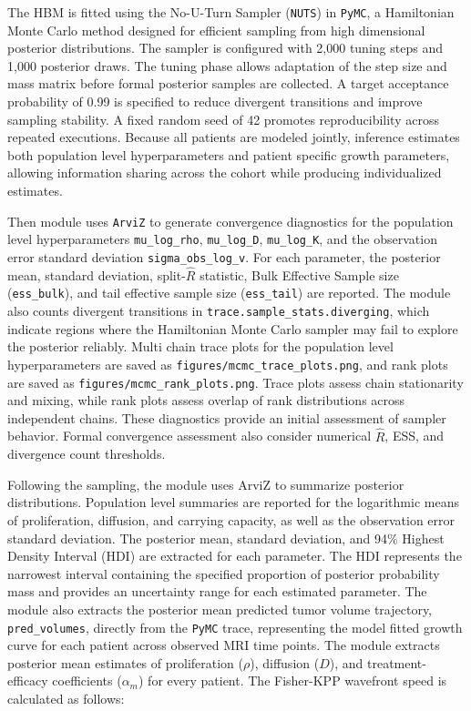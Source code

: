 The HBM is fitted using the No-U-Turn Sampler (\texttt{NUTS}) in \texttt{PyMC}, a Hamiltonian Monte Carlo method designed for efficient sampling from high dimensional posterior distributions. The sampler is configured with 2,000 tuning steps and 1,000 posterior draws. The tuning phase allows adaptation of the step size and mass matrix before formal posterior samples are collected. A target acceptance probability of 0.99 is specified to reduce divergent transitions and improve sampling stability. A fixed random seed of 42 promotes reproducibility across repeated executions. Because all patients are modeled jointly, inference estimates both population level hyperparameters and patient specific growth parameters, allowing information sharing across the cohort while producing individualized estimates.

Then module uses \texttt{ArviZ} to generate convergence diagnostics for the population level hyperparameters \texttt{mu\_log\_rho}, \texttt{mu\_log\_D}, \texttt{mu\_log\_K}, and the observation error standard deviation \texttt{sigma\_obs\_log\_v}. For each parameter, the posterior mean, standard deviation, split-$\widehat{R}$ statistic, Bulk Effective Sample size (\texttt{ess\_bulk}), and tail effective sample size (\texttt{ess\_tail}) are reported. The module also counts divergent transitions in \texttt{trace.sample\_stats.diverging}, which indicate regions where the Hamiltonian Monte Carlo sampler may fail to explore the posterior reliably. Multi chain trace plots for the population level hyperparameters are saved as \texttt{figures/mcmc\_trace\_plots.png}, and rank plots are saved as \texttt{figures/mcmc\_rank\_plots.png}. Trace plots assess chain stationarity and mixing, while rank plots assess overlap of rank distributions across independent chains. These diagnostics provide an initial assessment of sampler behavior. Formal convergence assessment also consider numerical $\widehat{R}$, ESS, and divergence count thresholds.

Following the sampling, the module uses ArviZ to summarize posterior distributions. Population level summaries are reported for the logarithmic means of proliferation, diffusion, and carrying capacity, as well as the observation error standard deviation. The posterior mean, standard deviation, and 94\% Highest Density Interval (HDI) are extracted for each parameter. The HDI represents the narrowest interval containing the specified proportion of posterior probability mass and provides an uncertainty range for each estimated parameter. The module also extracts the posterior mean predicted tumor volume trajectory, \texttt{pred\_volumes}, directly from the \texttt{PyMC} trace, representing the model fitted growth curve for each patient across observed MRI time points. The module extracts posterior mean estimates of proliferation ($\rho$), diffusion ($D$), and treatment-efficacy coefficients ($\alpha_m$) for every patient. The Fisher-KPP wavefront speed is calculated as follows:

